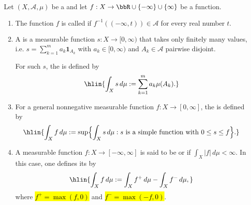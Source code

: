 \begin{definition} \label{definition:lebesgue_integral_of_measurable_functions_into_the}
Let $(X,\mathcal{A},\mu)$ be a  and let $f : X \to \bbR \cup \{-\infty\} \cup \{\infty\}$ be a function.
\begin{enumerate}
  \item The function $f$ is called  if $f^{-1}((-\infty,t)) \in \mathcal{A}$ for every real number $t$.

  \item A  is a measurable function $s : X \to [0,\infty)$ that takes only finitely many values, i.e. $s = \sum_{k=1}^m a_k \mathbf{1}_{A_k}$ with $a_k \in [0,\infty)$ and $A_k \in \mathcal{A}$ pairwise disjoint.

  For such $s$, the  is defined by
  $$\hlin{\int_X s\,d\mu := \sum_{k=1}^m a_k \mu(A_k).}$$
  \item For a general nonnegative measurable function $f : X \to [0,\infty]$, the  is defined by
  $$\hlin{\int_X f\,d\mu := \sup\Bigl\{\int_X s\,d\mu : s \text{ is a simple function with } 0 \le s \le f\Bigr\}.}$$

  \item A measurable function $f: X \to [-\infty,\infty]$ is said to be  or  if 
    $\int_X |f|\,d\mu < \infty.$
    In this case, one defines its  by 
    $$\hlin{\int_X f\,d\mu := \int_X f^+\,d\mu - \int_X f^-\,d\mu,}$$
    where \hl{$f^+ = \max(f,0)$} and \hl{$f^- = \max(-f,0)$}.
\end{enumerate}
\end{definition}